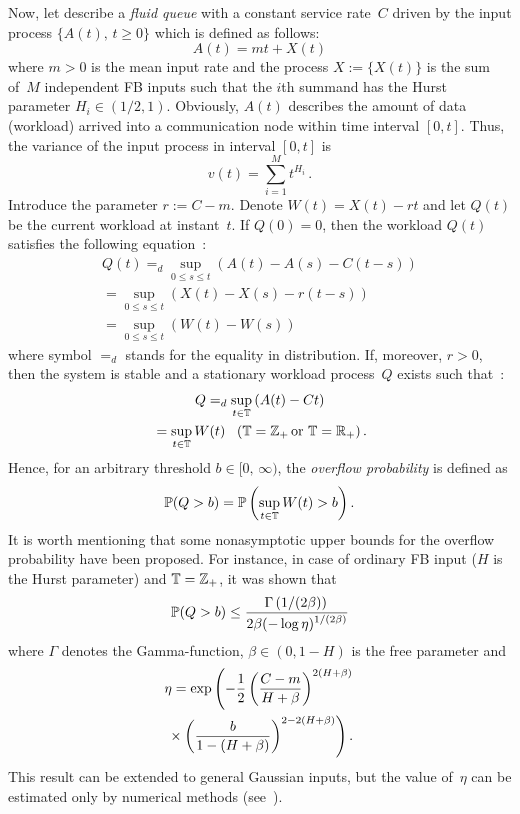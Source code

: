 \begin{multicols}{2}
Now, let describe  a {\it fluid queue} with a constant service rate~$C$
driven by the input process $\{A(t),\,t\ge 0\}$ which is defined
as follows:
 $$
 A(t)=mt+X(t)
 $$
 where $m>0$ is the  mean input rate and the process $X:=\{X(t)\}$
 is the  sum of~$M$ independent
 FB inputs such that  the $i$th summand  has
the   Hurst parameter $H_i \in (1/2,1)$.
 Obviously, $A(t)$ describes the amount of data (workload)
arrived into a communication node within time interval $[0, t]$.
Thus, the variance of the input process in  interval $[0, t]$ is
 $$
 v(t)=\sum\limits_{i=1}^M t^{H_i}\,.
 $$
Introduce the parameter
$r:=C-m$. Denote
$W(t)=X(t)-rt$ and  let  $Q(t)$ be the current workload  at instant~$t$.
If $Q(0)=0$, then the workload $Q(t)$ satisfies the  following
equation~\cite{Reich}:
\begin{multline*}
Q(t)=_d \sup\limits_{0 \leq s \leq t}(A(t)-A(s)-C(t-s))\\
{}= \sup\limits_{0 \leq s \leq t}(X(t)-X(s)-r(t-s))\\
{}=\sup\limits_{0 \leq s \leq t}(W(t)-W(s))
\end{multline*}
where symbol $=_d$ stands for the equality in distribution.
 If, moreover, $r>0$, then the
system is stable and a stationary  workload process~$Q$ exists such
that~\cite{Mandjes}:
\begin{multline}
Q=_d \sup\limits_{t \in \mathbb{T}} \left( A(t)-Ct \right)\\
{}= \sup\limits_{t \in \mathbb{T}} W(t)\;\;\; (\mathbb{T}=\mathbb{Z}_+\, \mbox{or}\,\,
\mathbb{T}=\mathbb R_+)\,.
\label{asymp-l1}
\end{multline}
Hence, for an  arbitrary threshold $b\in [0,\,\infty)$, the {\it overflow
probability} is defined as
\begin{equation*}
\mathbb{P}(Q>b)=\mathbb{P}\left( \sup\limits_{t \in \mathbb{T}} W(t) >b \right).
\end{equation*}
It is worth mentioning that some nonasymptotic upper bounds for the
overflow probability have been proposed.
For instance, in case of ordinary FB input ($H$ is the Hurst parameter)
and $\mathbb{T}=\mathbb{Z}_+$, it was shown that~\cite{Fidler1, Fidler2}
$$
\mathbb{P}(Q>b)\le \displaystyle\frac{\displaystyle \Gamma\left( 1/(2\beta) \right)\mathstrut}{\displaystyle 2\beta(-\log \eta)^{{1}/(2\beta)}\mathstrut}
$$
where $\Gamma$ denotes the Gamma-function, $\beta \in (0,1-H)$ is the
free parameter and
\begin{multline*}
\eta=\exp\left( -\displaystyle\frac{\displaystyle 1\mathstrut}{\displaystyle 2\mathstrut} \left( \displaystyle\frac{\displaystyle C-m\mathstrut}{\displaystyle H+\beta\mathstrut} \right)^{2(H+\beta)}\right.\\
\left.{}\times
\left( \displaystyle\frac{\displaystyle b\mathstrut}{\displaystyle 1-(H+\beta)\mathstrut} \right)^{2-2(H+\beta)} \right).
\end{multline*}
This result can be extended to general Gaussian inputs, but the value of~$\eta$
can be estimated only by numerical methods (see~\cite{Luk0}).


\end{multicols}
